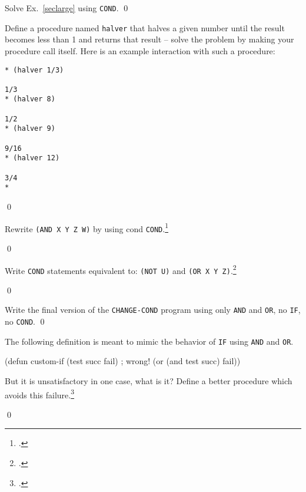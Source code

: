 \documentclass[a4paper,11pt]{article}
\begin{document}
\begin{uexercise}
Solve Ex.\ \ref{seclarge} using \Verb+COND+.
\qed
\end{uexercise}

\begin{uexercise}
Define a procedure named \Verb+halver+ that halves a given number until the result becomes less than 1 and returns that result -- solve the problem by making your procedure call itself. Here is an example interaction with such a procedure:

\begin{ucodeframe}
\begin{Verbatim}
* (halver 1/3)

1/3
* (halver 8)

1/2
* (halver 9)

9/16
* (halver 12)

3/4
*
\end{Verbatim}
\end{ucodeframe}

\qed
\end{uexercise}

\begin{uexercise}

Rewrite \Verb+(AND X Y Z W)+ by using cond \Verb+COND+.\footnote{.}

\qed
\end{uexercise}

\begin{uexercise}
Write \Verb+COND+ statements equivalent to: \Verb+(NOT U)+ and \Verb+(OR X Y Z)+.\footnote{.}

\qed
\end{uexercise}

\begin{uexercise}
Write the final version of the \Verb+CHANGE-COND+ program using only \Verb+AND+ and \Verb+OR+, no \Verb+IF+, no \Verb+COND+. 
\qed
\end{uexercise}

\begin{uexercise}
The following definition is meant to mimic the behavior of \Verb+IF+ using \Verb+AND+ and \Verb+OR+.

\begin{lispcode}
(defun custom-if (test succ fail) ; wrong!
  (or (and test succ) fail))
\end{lispcode}

But it is unsatisfactory in one case, what is it? 
Define a better procedure which avoids this failure.\footnote{.}

\qed
\end{uexercise}
\end{document}
